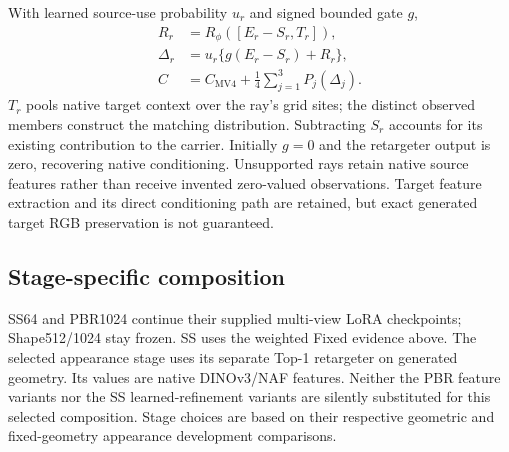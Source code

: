 With learned source-use probability $u_r$ and signed bounded gate $g$,
\begin{align}
 R_r&=R_\phi([E_r-S_r,T_r]),\\
 \Delta_r&=u_r\{g(E_r-S_r)+R_r\},\\
 C&=C_{\mathrm{MV4}}+\tfrac14\sum_{j=1}^{3}P_j(\Delta_j).
\end{align}
$T_r$ pools native target context over the ray's grid sites; the distinct
observed members construct the matching distribution. Subtracting $S_r$
accounts for its existing contribution to the carrier. Initially $g=0$ and
the retargeter output is zero, recovering native conditioning. Unsupported
rays retain native source features rather than receive invented zero-valued
observations. Target feature extraction and its direct conditioning path are
retained, but exact generated target RGB preservation is not guaranteed.

\subsection{Stage-specific composition}
SS64 and PBR1024 continue their supplied multi-view LoRA checkpoints;
Shape512/1024 stay frozen. SS uses the weighted Fixed evidence above. The
selected appearance stage uses its separate Top-1 retargeter on generated
geometry. Its values are native DINOv3/NAF features. Neither the PBR feature
variants nor the SS learned-refinement variants are silently substituted for
this selected composition. Stage choices are based on their respective
geometric and fixed-geometry appearance development comparisons.

